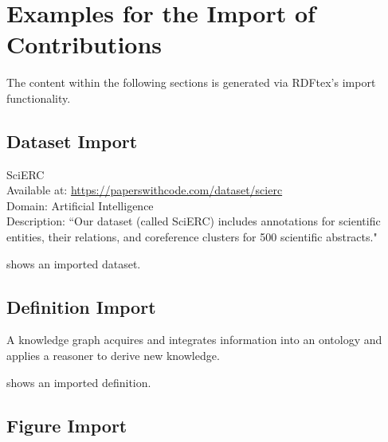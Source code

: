 
\section{Examples for the Import of Contributions}

The content within the following sections is generated via RDFtex's import functionality.

\subsection{Dataset Import}


 \begin{dataset}
 SciERC~\cite{DBLP:conf/emnlp/LuanHOH18}\\
 Available at: \url{https://paperswithcode.com/dataset/scierc}\\
 Domain: Artificial Intelligence\\
 Description: ``Our dataset (called SciERC) includes annotations for scientific entities, their relations, and coreference clusters for 500 scientific abstracts."~\cite{DBLP:conf/emnlp/LuanHOH18}
 \label{dataset:scierc}
 \end{dataset}
 
 shows an imported dataset.

\subsection{Definition Import}


 \begin{definition}
 \label{def:knowledge-graph}
 A knowledge graph acquires and integrates information into an ontology and applies a reasoner to derive new knowledge.
 \end{definition}
 
 shows an imported definition.

\subsection{Figure Import}


